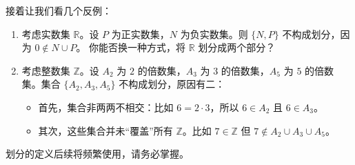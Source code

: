 \begin{example}
    接着让我们看几个反例：
    \begin{enumerate}[label=(\arabic*)]
        \item 考虑实数集 $\mathbb{R}$。设 $P$ 为正实数集，$N$ 为负实数集。则 $\{N, P\}$ 不构成划分，因为 $0 \notin N \cup P$。
        你能否换一种方式，将 $\mathbb{R}$ 划分成两个部分？
        \item 考虑整数集 $\mathbb{Z}$。设 $A_2$ 为 $2$ 的倍数集，$A_3$ 为 $3$ 的倍数集，$A_5$ 为 $5$ 的倍数集。集合 $\{A_2, A_3, A_5\}$ 不构成划分，原因有二：
        \begin{itemize}
            \item 首先，集合非两两不相交：比如 $6=2 \cdot 3$，所以 $6 \in A_2$ 且 $6 \in A_3$。
            \item 其次，这些集合并未``覆盖''所有 $\mathbb{Z}$。比如 $7 \in \mathbb{Z}$ 但 $7 \notin A_2 \cup A_3 \cup A_5$。
        \end{itemize}
    \end{enumerate}
\end{example}

划分的定义后续将频繁使用，请务必掌握。
